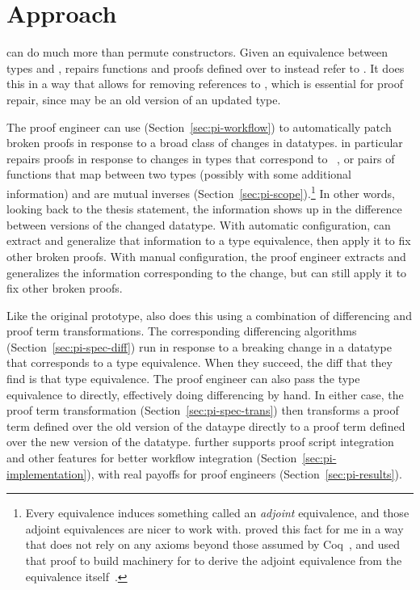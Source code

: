 \section{Approach}
\label{sec:pi-approach}


\toolnamec can do much more than permute constructors.
Given an equivalence between types \Aa and \B,
\toolnamec repairs functions and proofs defined over \Aa to instead refer to \B.
It does this in a way that allows for removing references to \Aa, which is essential for proof repair,
since \Aa may be an old version of an updated type.

The proof engineer can use \toolnamec (Section~\ref{sec:pi-workflow}) to automatically patch broken proofs in response to a broad class of changes in datatypes.
\toolnamec in particular repairs proofs in response to changes in types that correspond to ~\cite{univalent2013homotopy},
or pairs of functions that map between two types (possibly with some additional information) and are mutual 
inverses (Section~\ref{sec:pi-scope}).\footnote{Every equivalence induces something called an \textit{adjoint} equivalence,
and those adjoint equivalences are nicer to work with.
 proved this fact for me in a way that does not rely on any axioms beyond those assumed by Coq~\href{https://github.com/uwplse/pumpkin-pi/blob/v2.0.0/plugin/theories/Adjoint.v}{},
and  used that proof to build machinery for \toolnamec to derive the adjoint equivalence from the equivalence itself~\href{https://github.com/uwplse/pumpkin-pi/blob/v2.0.0/plugin/src/automation/search/equivalence.ml}{}.}
In other words, looking back to the thesis statement, the information shows up in the difference between versions of the changed datatype.
With automatic configuration, \toolnamec can extract and generalize that information to a type equivalence, then apply it to fix other broken proofs.
With manual configuration, the proof engineer extracts and generalizes the information corresponding to the change, but \toolnamec can still apply it
to fix other broken proofs.

Like the original \sysname prototype, \toolnamec also does this using a combination of differencing and proof term transformations.
The corresponding differencing algorithms (Section~\ref{sec:pi-spec-diff}) run in response to a breaking change in a datatype that corresponds to a type equivalence.
When they succeed, the diff that they find is that type equivalence.
The proof engineer can also pass the type equivalence to \toolnamec directly, effectively doing differencing by hand.
In either case, the proof term transformation (Section~\ref{sec:pi-spec-trans}) then transforms a proof term defined over the old version of the dataype
directly to a proof term defined over the new version of the datatype.
\toolnamec further supports proof script integration and other features for better workflow integration (Section~\ref{sec:pi-implementation}),
with real payoffs for proof engineers (Section~\ref{sec:pi-results}).

